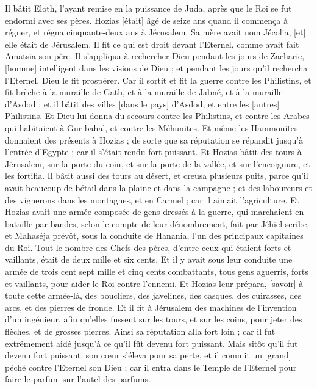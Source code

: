 \begin{multicols}{2}
Il bâtit Eloth, l'ayant remise en la puissance de Juda, après que le Roi se fut endormi avec ses pères.
Hozias [était] âgé de seize ans quand il commença à régner, et régna cinquante-deux ans à Jérusalem. Sa mère avait nom Jécolia, [et] elle était de Jérusalem.
Il fit ce qui est droit devant l'Eternel, comme avait fait Amatsia son père.
Il s'appliqua à rechercher Dieu pendant les jours de Zacharie, [homme] intelligent dans les visions de Dieu ; et pendant les jours qu'il rechercha l'Eternel, Dieu le fit prospérer.
Car il sortit et fit la guerre contre les Philistins, et fit brèche à la muraille de Gath, et à la muraille de Jabné, et à la muraille d'Asdod ; et il bâtit des villes [dans le pays] d'Asdod, et entre les [autres] Philistins.
Et Dieu lui donna du secours contre les Philistins, et contre les Arabes qui habitaient à Gur-bahal, et contre les Méhunites.
Et même les Hammonites donnaient des présents à Hozias ; de sorte que sa réputation se répandit jusqu'à l'entrée d'Egypte ; car il s'était rendu fort puissant.
Et Hozias bâtit des tours à Jérusalem, sur la porte du coin, et sur la porte de la vallée, et sur l'encoignure, et les fortifia.
Il bâtit aussi des tours au désert, et creusa plusieurs puits, parce qu'il avait beaucoup de bétail dans la plaine et dans la campagne ; et des laboureurs et des vignerons dans les montagnes, et en Carmel ; car il aimait l'agriculture.
Et Hozias avait une armée composée de gens dressés à la guerre, qui marchaient en bataille par bandes, selon le compte de leur dénombrement, fait par Jéhiël scribe, et Mahaséja prévôt, sous la conduite de Hanania, l'un des principaux capitaines du Roi.
Tout le nombre des Chefs des pères, d'entre ceux qui étaient forts et vaillants, était de deux mille et six cents.
Et il y avait sous leur conduite une armée de trois cent sept mille et cinq cents combattants, tous gens aguerris, forts et vaillants, pour aider le Roi contre l'ennemi.
Et Hozias leur prépara, [savoir] à toute cette armée-là, des boucliers, des javelines, des casques, des cuirasses, des arcs, et des pierres de fronde.
Et il fit à Jérusalem des machines de l'invention d'un ingénieur, afin qu'elles fussent sur les tours, et sur les coins, pour jeter des flèches, et de grosses pierres. Ainsi sa réputation alla fort loin ; car il fut extrêmement aidé jusqu'à ce qu'il fût devenu fort puissant.
Mais sitôt qu'il fut devenu fort puissant, son cœur s'éleva pour sa perte, et il commit un [grand] péché contre l'Eternel son Dieu ; car il entra dans le Temple de l'Eternel pour faire le parfum sur l'autel des parfums.

\end{multicols}
